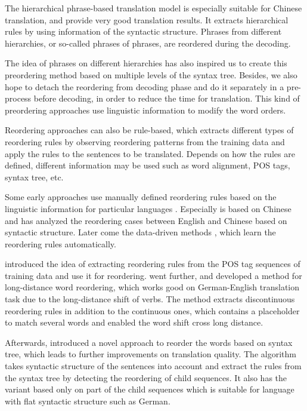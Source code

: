 The hierarchical phrase-based translation model \citep{hier} is especially suitable for Chinese translation, and provide very good translation results. It extracts hierarchical rules by using information of the syntactic structure. Phrases from different hierarchies, or so-called phrases of phrases, are reordered during the decoding. 

The idea of phrases on different hierarchies has also inspired us to create this preordering method based on multiple levels of the syntax tree. Besides, we also hope to detach the reordering from decoding phase and do it separately in a pre-process before decoding, in order to reduce the time for translation. This kind of preordering approaches use linguistic information to modify the word orders. 

Reordering approaches can also be rule-based, which extracts different types of reordering rules by observing reordering patterns from the training data and apply the rules to the sentences to be translated. Depends on how the rules are defined, different information may be used such as word alignment, \ac{POS} tags, syntax tree, etc.

Some early approaches use manually defined reordering rules based on the linguistic information for particular languages \citep{collins2005clause, popovic2006pos,habash2007syntactic}. Especially \cite{syntactic} is based on Chinese and has analyzed the reordering cases between English and Chinese based on syntactic structure. Later come the data-driven methods \citep{zhang2007chunk, crego2008using}, which learn the reordering rules automatically. 

\cite{short} introduced the idea of extracting reordering rules from the POS tag sequences of training data and use it for reordering. \cite{long} went further, and developed a method for long-distance word reordering, which works good on German-English translation task due to the long-distance shift of verbs. The method extracts discontinuous reordering rules in addition to the continuous ones, which contains a placeholder to match several words and enabled the word shift cross long distance.

Afterwards, \cite{tree} introduced a novel approach to reorder the words based on syntax tree, which leads to further improvements on translation quality. The algorithm takes syntactic structure of the sentences into account and extract the rules from the syntax tree by detecting the reordering of child sequences. It also has the variant based only on part of the child sequences which is suitable for language with flat syntactic structure such as German.

